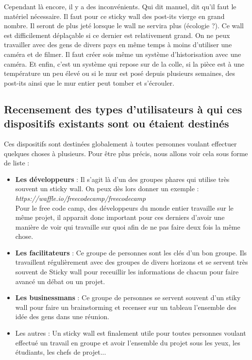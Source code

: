 \documentclass{article}
\begin{document}
\vspace{0.2cm}
\hspace*{0.6cm}Cependant là encore, il y a des inconvénients. Qui dit manuel, dit qu'il faut le matériel nécessaire. Il faut pour ce sticky wall des post-its vierge en grand nombre. Il seront de plus jeté lorsque le wall ne servira plus (écologie ?). Ce wall est difficilement déplaçable si ce dernier est relativement grand. On ne peux travailler avec des gens de divers pays en même temps à moins d'utiliser une caméra et de filmer. Il faut créer sois même un système d'historisation avec une caméra. Et enfin, c'est un système qui repose sur de la colle, si la pièce est à une température un peu élevé ou si le mur est posé depuis plusieurs semaines, des post-its ainsi que le mur entier peut tomber et s'écrouler.

\subsection{Recensement des types d’utilisateurs à qui ces dispositifs existants sont ou étaient destinés}
\hspace*{0.6cm}Ces dispositifs sont destinées globalement à toutes personnes voulant effectuer quelques choses à plusieurs. Pour être plus précis, nous allons voir cela sous forme de liste :
\vspace{0.2cm}
\begin{itemize}
  \item \textbf{Les développeurs} : Il s'agit là d'un des groupes phares qui utilise très souvent un sticky wall. On peux dès lors donner un exemple : \textit{https://waffle.io/freecodecamp/freecodecamp}\\
Pour le free code camp, des développeurs du monde entier travaille sur le même projet, il apparait donc important pour ces derniers d'avoir une manière de voir qui travaille sur quoi afin de ne pas faire deux fois la même chose.
  \item \textbf{Les facilitateurs} : Ce groupe de personnes sont les clés d'un bon groupe. Ils travaillent régulièrement avec des groupes de divers horizons et se servent très souvent de Sticky wall pour receuillir les informations de chacun pour faire avancé un débat ou un projet.
  \item \textbf{Les businessmans} : Ce groupe de personnes se servent souvent d'un stiky wall pour faire un brainstorming et recenser sur un tableau l'ensemble des idée des gens dans une réunion.
  \item {Les autres} : Un sticky wall est finalement utile pour toutes personnes voulant effectué un travail en groupe et avoir l'ensemble du projet sous les yeux, les étudiants, les chefs de projet...
\end{itemize}
\end{document}
